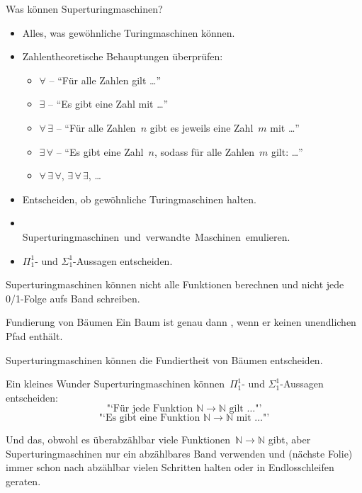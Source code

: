 \documentclass[12pt,compress,ngerman,utf8,t]{beamer}
\newcommand{\NN}{\mathbb{N}}
\newcommand{\hil}[1]{{\usebeamercolor[fg]{item}{\textbf{#1}}}}
\begin{document}
\begin{frame}{Was können Superturingmaschinen?}
  \begin{itemize}
    \item Alles, was gewöhnliche Turingmaschinen können.
    \item Zahlentheoretische Behauptungen überprüfen:
      \begin{itemize}
        \item $\forall$ -- "`Für alle Zahlen gilt \ldots"'    %
        \item $\exists$ -- "`Es gibt eine Zahl mit \ldots"'   %
        \item $\forall\,\exists$ -- "`Für alle Zahlen~$n$
        gibt es jeweils eine Zahl~$m$ mit \ldots"'            %
        \item $\exists\,\forall$ -- "`Es gibt eine Zahl~$n$,
        sodass für alle Zahlen~$m$ gilt: \ldots"'             %
        \item $\forall\,\exists\,\forall$,                    %
        $\exists\,\forall\,\exists$, \ldots
      \end{itemize}
    \item Entscheiden, ob gewöhnliche Turingmaschinen halten.
    \item \ \\[-1.2em]\mbox{Superturingmaschinen und verwandte Maschinen emulieren.}
    \item $\Pi_1^1$- und $\Sigma_1^1$-Aussagen entscheiden.
  \end{itemize}
  \pause

  \hil{Aber:} Superturingmaschinen können nicht alle Funktionen berechnen
  und nicht jede 0/1-Folge aufs Band schreiben.
\end{frame}

\begin{frame}{Fundierung von Bäumen}
  Ein Baum ist genau dann \hil{fundiert}, wenn er keinen unendlichen Pfad enthält.

  \begin{center}
    \scalebox{0.4}{}
  \end{center}

  Superturingmaschinen können die Fundiertheit von Bäumen entscheiden.
\end{frame}

\begin{frame}{Ein kleines Wunder}
  Superturingmaschinen können~$\Pi_1^1$- und $\Sigma_1^1$-Aussagen entscheiden:
  \[ \text{"`Für jede Funktion~$\NN \to \NN$ gilt \ldots"'} \]
  \[ \text{"`Es gibt eine Funktion~$\NN \to \NN$ mit \ldots"'} \]

  \vspace*{0.5em}
  Und das, obwohl es überabzählbar viele Funktionen~$\NN \to \NN$ gibt, aber
  Superturingmaschinen nur ein abzählbares Band verwenden und (nächste
  Folie) immer schon nach abzählbar vielen Schritten halten
  oder in Endlosschleifen geraten.
\end{frame}
\end{document}
